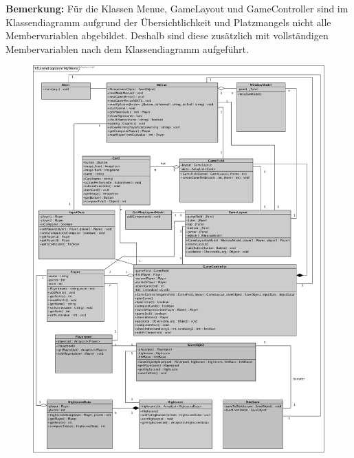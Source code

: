\textbf{Bemerkung: }Für die Klassen Menue, GameLayout und GameController sind im Klassendiagramm aufgrund der Übersichtlichkeit und Platzmangels nicht alle Membervariablen abgebildet. Deshalb sind diese zusätzlich mit vollständigen Membervariablen nach dem Klassendiagramm aufgeführt.
    
 
\begin{figure}[!h]
	\centering
    \includegraphics[width=\textwidth]{./Klassendiagramm.png}
	\label{layout_gesamt}
\end{figure}

